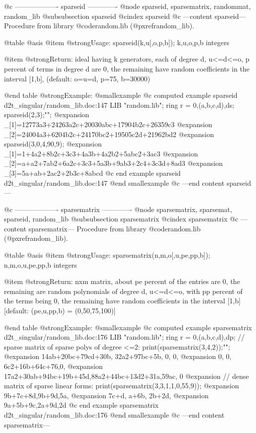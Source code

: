 @c ------------------- sparseid -------------
@node sparseid, sparsematrix, randommat, random_lib
@subsubsection sparseid
@cindex sparseid
@c ---content sparseid---
Procedure from library @code{random.lib} (@pxref{random_lib}).

@table @asis
@item @strong{Usage:}
sparseid(k,u[,o,p,b]); k,u,o,p,b integers

@item @strong{Return:}
ideal having k generators, each of degree d, u<=d<=o, p percent of
terms in degree d are 0, the remaining have random coefficients
in the interval [1,b], (default: o=u=d, p=75, b=30000)

@end table
@strong{Example:}
@smallexample
@c computed example sparseid d2t_singular/random_lib.doc:147 
LIB "random.lib";
ring r = 0,(a,b,c,d),ds;
sparseid(2,3);"";
@expansion{} _[1]=12773a3+24263a2c+20030abc+17904b2c+26359c3
@expansion{} _[2]=24004a3+6204b2c+24170bc2+19505c2d+21962bd2
@expansion{} 
sparseid(3,0,4,90,9);
@expansion{} _[1]=1+4a2+8b2c+3c3+4a3b+4a2b2+5abc2+3ac3
@expansion{} _[2]=a+a2+7ab2+6a2c+3c3+5a3b+9ab3+2c4+3c3d+8ad3
@expansion{} _[3]=5a+ab+2ac2+2b3c+8abcd
@c end example sparseid d2t_singular/random_lib.doc:147
@end smallexample
@c ---end content sparseid---

@c ------------------- sparsematrix -------------
@node sparsematrix, sparsemat, sparseid, random_lib
@subsubsection sparsematrix
@cindex sparsematrix
@c ---content sparsematrix---
Procedure from library @code{random.lib} (@pxref{random_lib}).

@table @asis
@item @strong{Usage:}
sparsematrix(n,m,o[,u,pe,pp,b]); n,m,o,u,pe,pp,b integers

@item @strong{Return:}
nxm matrix, about pe percent of the entries are 0, the remaining
are random polynomials of degree d, u<=d<=o, with pp percent of
the terms being 0, the remaining have random coefficients
in the interval [1,b] [default: (pe,u,pp,b) = (0,50,75,100)]

@end table
@strong{Example:}
@smallexample
@c computed example sparsematrix d2t_singular/random_lib.doc:176 
LIB "random.lib";
ring r = 0,(a,b,c,d),dp;
// sparse matrix of sparse polys of degree <=2:
print(sparsematrix(3,4,2));"";
@expansion{} 14ab+20bc+79cd+30b,    32a2+97bc+5b,      0,             0,
@expansion{} 0,                     0,                 6c2+16b+64c+76,0,
@expansion{} 17a2+30ab+94bc+19b+45d,88a2+44bc+13d2+31a,59ac,          0 
@expansion{} 
// dense matrix of sparse linear forms:
print(sparsematrix(3,3,1,1,0,55,9));
@expansion{} 9b+7c+8d,9b+9d,5a,   
@expansion{} 7c+d,    a+6b, 2b+2d,
@expansion{} 9a+5b+9c,2a+9d,2d    
@c end example sparsematrix d2t_singular/random_lib.doc:176
@end smallexample
@c ---end content sparsematrix---


